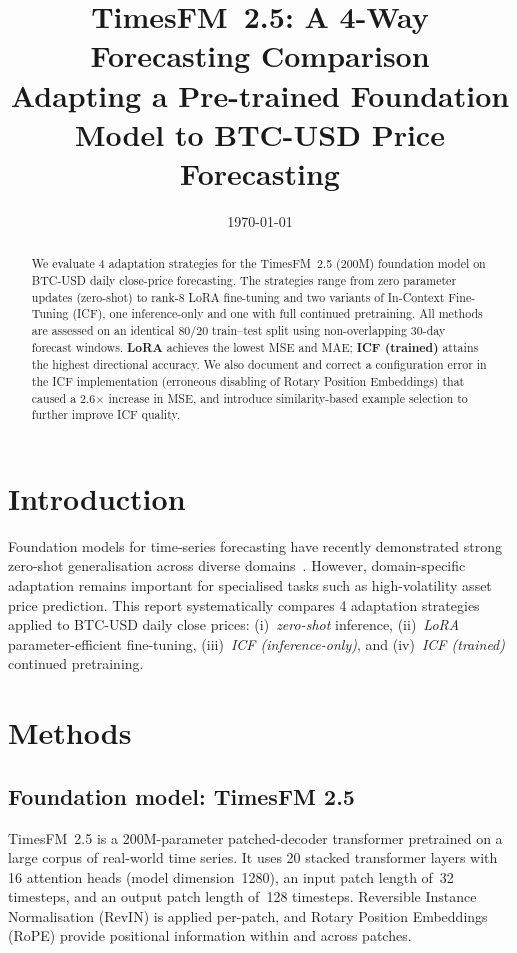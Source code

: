 \documentclass[11pt,a4paper]{article}
\begin{document}
\title{\textbf{TimesFM~2.5: A 4-Way Forecasting Comparison}\\
\large Adapting a Pre-trained Foundation Model to BTC-USD Price Forecasting}
\date{\today}
\maketitle
\thispagestyle{plain}

\begin{abstract}
We evaluate 4 adaptation strategies for the TimesFM~2.5 (200M) foundation model on BTC-USD daily close-price forecasting. The strategies range from zero parameter updates (zero-shot) to rank-8 LoRA fine-tuning and two variants of In-Context Fine-Tuning (ICF), one inference-only and one with full continued pretraining. All methods are assessed on an identical 80/20 train--test split using non-overlapping 30-day forecast windows. \textbf{LoRA} achieves the lowest MSE and MAE; \textbf{ICF (trained)} attains the highest directional accuracy. We also document and correct a configuration error in the ICF implementation (erroneous disabling of Rotary Position Embeddings) that caused a 2.6$\times$ increase in MSE, and introduce similarity-based example selection to further improve ICF quality.
\end{abstract}

\section{Introduction}
Foundation models for time-series forecasting have recently demonstrated strong zero-shot generalisation across diverse domains~\citep{TimesFM2024}. However, domain-specific adaptation remains important for specialised tasks such as high-volatility asset price prediction. This report systematically compares 4 adaptation strategies applied to BTC-USD daily close prices: (i)~\emph{{zero-shot}} inference, (ii)~\emph{{LoRA}} parameter-efficient fine-tuning, (iii)~\emph{ICF (inference-only)}, and (iv)~\emph{ICF (trained)} continued pretraining.

\section{Methods}

\subsection{Foundation model: TimesFM 2.5}
TimesFM~2.5 is a 200M-parameter patched-decoder transformer pretrained on a large corpus of real-world time series. It uses 20 stacked transformer layers with 16 attention heads (model dimension~1280), an input patch length of~32 timesteps, and an output patch length of~128 timesteps. Reversible Instance Normalisation (RevIN) is applied per-patch, and Rotary Position Embeddings (RoPE) provide positional information within and across patches.
\end{document}

